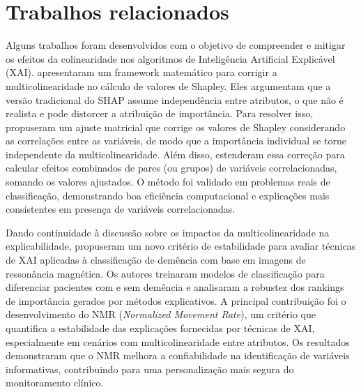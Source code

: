 

\section{Trabalhos relacionados}\label{sec:trabalhos_relacionados}

Alguns trabalhos foram desenvolvidos com o objetivo de compreender e mitigar os efeitos da colinearidade nos algoritmos de Inteligência Artificial Explicável (XAI).  apresentaram um framework matemático para corrigir a multicolinearidade no cálculo de valores de Shapley. Eles argumentam que a versão tradicional do SHAP assume independência entre atributos, o que não é realista e pode distorcer a atribuição de importância. Para resolver isso, propuseram um ajuste matricial que corrige os valores de Shapley considerando as correlações entre as variáveis, de modo que a importância individual se torne independente da multicolinearidade. Além disso, estenderam essa correção para calcular efeitos combinados de pares (ou grupos) de variáveis correlacionadas, somando os valores ajustados. O método foi validado em problemas reais de classificação, demonstrando boa eficiência computacional e explicações mais consistentes em presença de variáveis correlacionadas.

Dando continuidade à discussão sobre os impactos da multicolinearidade na explicabilidade,  propuseram um novo critério de estabilidade para avaliar técnicas de XAI aplicadas à classificação de demência com base em imagens de ressonância magnética. Os autores treinaram modelos de classificação para diferenciar pacientes com e sem demência e analisaram a robustez dos rankings de importância gerados por métodos explicativos. A principal contribuição foi o desenvolvimento do NMR (\textit{Normalized Movement Rate}), um critério que quantifica a estabilidade das explicações fornecidas por técnicas de XAI, especialmente em cenários com multicolinearidade entre atributos. Os resultados demonstraram que o NMR melhora a confiabilidade na identificação de variáveis informativas, contribuindo para uma personalização mais segura do monitoramento clínico.

